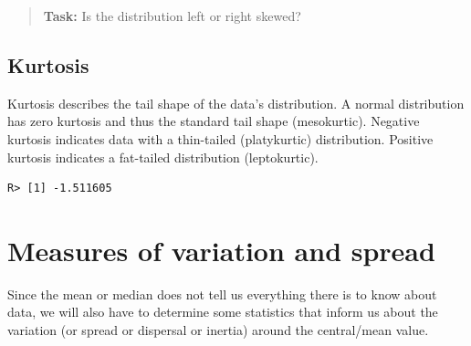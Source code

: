 \documentclass[english,10pt,a4paper,oneside]{book}
\newenvironment{Shaded}{\begin{snugshade}}{\end{snugshade}}
\newcommand{\CommentTok}[1]{\textcolor[rgb]{0.56,0.35,0.01}{\textit{#1}}}
\newcommand{\KeywordTok}[1]{\textcolor[rgb]{0.13,0.29,0.53}{\textbf{#1}}}
\newcommand{\NormalTok}[1]{#1}
\newcommand{\OperatorTok}[1]{\textcolor[rgb]{0.81,0.36,0.00}{\textbf{#1}}}
\theoremstyle{definition}
\theoremstyle{definition}
\theoremstyle{definition}
\theoremstyle{remark}
\begin{document}
\begin{quote}
\textbf{Task:} Is the distribution left or right skewed?
\end{quote}

\hypertarget{kurtosis}{%
\subsection{Kurtosis}\label{kurtosis}}

Kurtosis describes the tail shape of the data's distribution. A normal
distribution has zero kurtosis and thus the standard tail shape
(mesokurtic). Negative kurtosis indicates data with a thin-tailed
(platykurtic) distribution. Positive kurtosis indicates a fat-tailed
distribution (leptokurtic).

\begin{Shaded}
\end{Shaded}

\begin{verbatim}
R> [1] -1.511605
\end{verbatim}

\hypertarget{measures-of-variation-and-spread}{%
\section{Measures of variation and
spread}\label{measures-of-variation-and-spread}}

Since the mean or median does not tell us everything there is to know
about data, we will also have to determine some statistics that inform
us about the variation (or spread or dispersal or inertia) around the
central/mean value.
\end{document}
